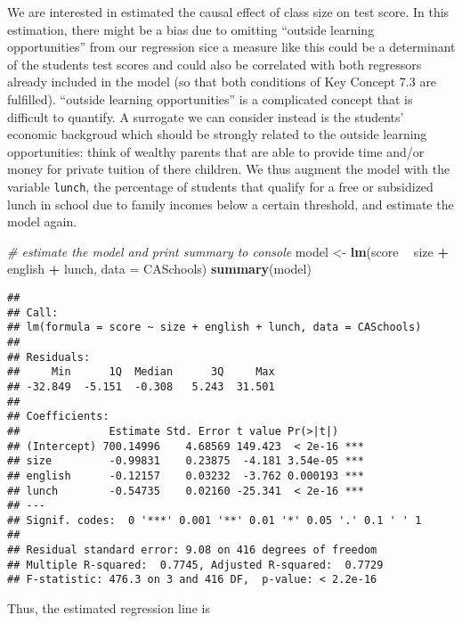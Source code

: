 \documentclass[]{book}
\newenvironment{Shaded}{\begin{snugshade}}{\end{snugshade}}
\newcommand{\KeywordTok}[1]{\textcolor[rgb]{0.13,0.29,0.53}{\textbf{#1}}}
\newcommand{\DataTypeTok}[1]{\textcolor[rgb]{0.13,0.29,0.53}{#1}}
\newcommand{\StringTok}[1]{\textcolor[rgb]{0.31,0.60,0.02}{#1}}
\newcommand{\CommentTok}[1]{\textcolor[rgb]{0.56,0.35,0.01}{\textit{#1}}}
\newcommand{\OperatorTok}[1]{\textcolor[rgb]{0.81,0.36,0.00}{\textbf{#1}}}
\newcommand{\NormalTok}[1]{#1}
\theoremstyle{definition}
\theoremstyle{definition}
\theoremstyle{definition}
\theoremstyle{remark}
\begin{document}
We are interested in estimated the causal effect of class size on test
score. In this estimation, there might be a bias due to omitting
``outside learning opportunities'' from our regression sice a measure
like this could be a determinant of the students test scores and could
also be correlated with both regressors already included in the model
(so that both conditions of Key Concept 7.3 are fulfilled). ``outside
learning opportunities'' is a complicated concept that is difficult to
quantify. A surrogate we can consider instead is the students' economic
backgroud which should be strongly related to the outside learning
opportunities: think of wealthy parents that are able to provide time
and/or money for private tuition of there children. We thus augment the
model with the variable \texttt{lunch}, the percentage of students that
qualify for a free or subsidized lunch in school due to family incomes
below a certain threshold, and estimate the model again.

\begin{Shaded}
\begin{Highlighting}[]
\CommentTok{# estimate the model and print summary to console}
\NormalTok{model <-}\StringTok{ }\KeywordTok{lm}\NormalTok{(score }\OperatorTok{~}\StringTok{ }\NormalTok{size }\OperatorTok{+}\StringTok{ }\NormalTok{english }\OperatorTok{+}\StringTok{ }\NormalTok{lunch, }\DataTypeTok{data =}\NormalTok{ CASchools)}
\KeywordTok{summary}\NormalTok{(model)}
\end{Highlighting}
\end{Shaded}

\begin{verbatim}
## 
## Call:
## lm(formula = score ~ size + english + lunch, data = CASchools)
## 
## Residuals:
##     Min      1Q  Median      3Q     Max 
## -32.849  -5.151  -0.308   5.243  31.501 
## 
## Coefficients:
##              Estimate Std. Error t value Pr(>|t|)    
## (Intercept) 700.14996    4.68569 149.423  < 2e-16 ***
## size         -0.99831    0.23875  -4.181 3.54e-05 ***
## english      -0.12157    0.03232  -3.762 0.000193 ***
## lunch        -0.54735    0.02160 -25.341  < 2e-16 ***
## ---
## Signif. codes:  0 '***' 0.001 '**' 0.01 '*' 0.05 '.' 0.1 ' ' 1
## 
## Residual standard error: 9.08 on 416 degrees of freedom
## Multiple R-squared:  0.7745, Adjusted R-squared:  0.7729 
## F-statistic: 476.3 on 3 and 416 DF,  p-value: < 2.2e-16
\end{verbatim}

Thus, the estimated regression line is
\end{document}
